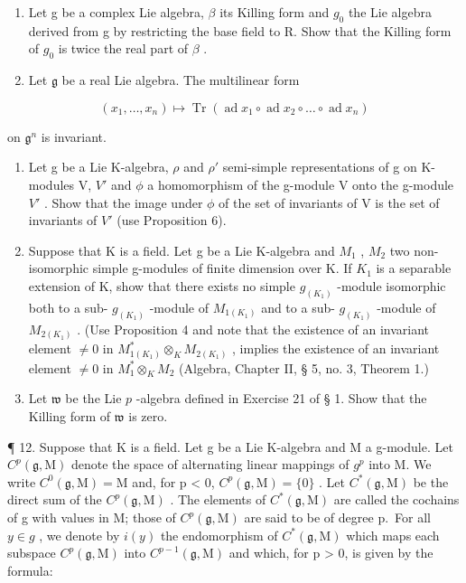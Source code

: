 \begin{enumerate}
\def\labelenumi{\arabic{enumi}.}
\setcounter{enumi}{6}
\item
  Let g be a complex Lie algebra, \(\beta\) its Killing form and \(g_{0}\) the Lie algebra derived from g by restricting the base field to R. Show that the Killing form of \(g_{0}\) is twice the real part of \(\beta\) .
\item
  Let \(\mathfrak{g}\) be a real Lie algebra. The multilinear form
\end{enumerate}

\[
(x _ {1}, \dots , x _ {n}) \mapsto \operatorname{Tr} (\operatorname{ad} x _ {1} \circ \operatorname{ad} x _ {2} \circ \dots \circ \operatorname{ad} x _ {n})
\]

on \(\mathfrak{g}^n\) is invariant.

\begin{enumerate}
\def\labelenumi{\arabic{enumi}.}
\setcounter{enumi}{8}
\item
  Let g be a Lie K-algebra, \(\rho\) and \(\rho'\) semi-simple representations of g on K-modules V, \(V'\) and \(\phi\) a homomorphism of the g-module V onto the g-module \(V'\) . Show that the image under \(\phi\) of the set of invariants of V is the set of invariants of \(V'\) (use Proposition 6).
\item
  Suppose that K is a field. Let g be a Lie K-algebra and \(M_{1}\) , \(M_{2}\) two non-isomorphic simple g-modules of finite dimension over K. If \(K_{1}\) is a separable extension of K, show that there exists no simple \(g_{(K_{1})}\) -module isomorphic both to a sub- \(g_{(K_{1})}\) -module of \(M_{1(K_{1})}\) and to a sub- \(g_{(K_{1})}\) -module of \(M_{2(K_{1})}\) . (Use Proposition 4 and note that the existence of an invariant element \(\neq0\) in \(M_{1(K_{1})}^{*}\otimes_{K}M_{2(K_{1})}\) , implies the existence of an invariant element \(\neq0\) in \(M_{1}^{*}\otimes_{K}M_{2}\) (Algebra, Chapter II, § 5, no. 3, Theorem 1.)
\item
  Let \(\mathfrak{w}\) be the Lie \(p\) -algebra defined in Exercise 21 of § 1. Show that the Killing form of \(\mathfrak{w}\) is zero.
\end{enumerate}

¶ 12. Suppose that K is a field. Let g be a Lie K-algebra and M a g-module. Let \(C^{p}(\mathfrak{g}, \mathrm{M})\) denote the space of alternating linear mappings of \(g^{p}\) into M. We write \(C^{0}(\mathfrak{g}, \mathrm{M}) = \mathrm{M}\) and, for p \textless{} 0, \(C^{p}(\mathfrak{g}, \mathrm{M}) = \{0\}\) . Let \(C^{*}(\mathfrak{g}, \mathrm{M})\) be the direct sum of the \(C^{p}(\mathfrak{g}, \mathrm{M})\) . The elements of \(C^{*}(\mathfrak{g}, \mathrm{M})\) are called the cochains of g with values in M; those of \(C^{p}(\mathfrak{g}, \mathrm{M})\) are said to be of degree p.~For all \(y \in g\) , we denote by \(i(y)\) the endomorphism of \(C^{*}(\mathfrak{g}, \mathrm{M})\) which maps each subspace \(C^{p}(\mathfrak{g}, \mathrm{M})\) into \(C^{p-1}(\mathfrak{g}, \mathrm{M})\) and which, for p \textgreater{} 0, is given by the formula:

